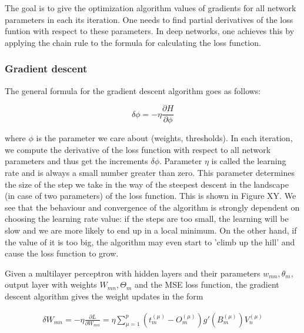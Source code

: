 The goal is to give the optimization algorithm values of gradients for all network parameters in each its iteration. One needs to find partial derivatives of the loss funtion with respect to these parameters. In deep networks, one achieves this by applying the chain rule to the formula for calculating the loss function.

\subsubsection{Gradient descent}

The general formula for the gradient descent algorithm goes as follows:

$$ 
\delta \phi = - \eta \frac{\partial H}{\partial \phi}
$$

where $ \phi $ is the parameter we care about (weights, thresholds). In each iteration, we compute the derivative of the loss function with respect to all network parameters and thus get the increments $ \delta \phi $. Parameter $ \eta $ is called the learning rate and is always a small number greater than zero. This parameter determines the size of the step we take in the way of the steepest descent in the landscape (in case of two parameters) of the loss function. This is shown in Figure XY. We see that the behaviour and convergence of the algorithm is strongly dependent on choosing the learning rate value: if the steps are too small, the learning will be slow and we are more likely to end up in a local minimum. On the other hand, if the value of it is too big, the algorithm may even start to 'climb up the hill' and cause the loss function to grow. 

Given a multilayer perceptron with hidden layers and their parameters $ w_{mn}, \theta_m $, output layer with weights $ W_{mn}, \Theta_m $ and the MSE loss function, the gradient descent algorithm gives the weight updates in the form


\begin{gather}
	\delta W_{mn} = - \eta \frac{\partial L}{\partial W_{mn}} = \eta \sum\limits_{\mu=1}^{p}
	(t_{m}^{(\mu)} - O_{m}^{(\mu)})   g'(B_{m}^{(\mu)})     V_{n}^{(\mu)}	
\end{gather}

